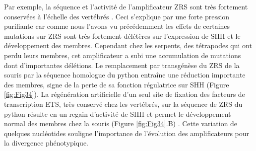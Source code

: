Par exemple, la séquence et l’activité de l’\gls{amplificateur} \acrshort{ZRS} sont très fortement conservées à l’échelle des vertébrés \citep{kvon_progressive_2016}. Ceci s’explique par une forte pression purifiante car comme nous l’avons vu précédemment les effets de certaines mutations sur \acrshort{ZRS} sont très fortement délétères sur l’expression de \acrshort{SHH} et le développement des membres. Cependant chez les serpents, des tétrapodes qui ont perdu leurs membres, cet \gls{amplificateur} a subi une accumulation de mutations dont d’importantes délétions. Le remplacement par transgénèse du \acrshort{ZRS} de la souris par la séquence homologue du python entraîne une réduction importante des membres, signe de la perte de sa fonction régulatrice sur \acrshort{SHH} (Figure \ref{fig:Fig34}). La régénération artificielle d’un seul site de fixation des facteurs de transcription ETS, très conservé chez les vertébrés, sur la séquence de \acrshort{ZRS} du python résulte en un regain d’activité de \acrshort{SHH} et permet le développement normal des membres chez la souris (Figure \ref{fig:Fig34}.B) \citep{lettice_opposing_2012}. Cette variation de quelques nucléotides souligne l’importance de l’évolution des \glspl{amplificateur} pour la divergence phénotypique. 

